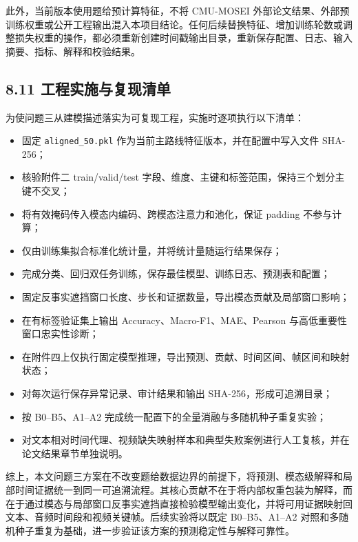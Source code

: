 \documentclass[
  12pt,
  a4paper,
]{ctexart}
\providecommand{\tightlist}{%
  \setlength{\itemsep}{0pt}\setlength{\parskip}{0pt}}
\begin{document}
此外，当前版本使用题给预计算特征，不将 CMU-MOSEI
外部论文结果、外部预训练权重或公开工程输出混入本项目结论。任何后续替换特征、增加训练轮数或调整损失权重的操作，都必须重新创建时间戳输出目录，重新保存配置、日志、输入摘要、指标、解释和校验结果。

\hypertarget{ux5de5ux7a0bux5b9eux65bdux4e0eux590dux73b0ux6e05ux5355}{%
\subsection{8.11
工程实施与复现清单}\label{ux5de5ux7a0bux5b9eux65bdux4e0eux590dux73b0ux6e05ux5355}}

为使问题三从建模描述落实为可复现工程，实施时逐项执行以下清单：

\begin{itemize}
\tightlist
\item[$\boxtimes$]
  固定 \texttt{aligned\_50.pkl}
  作为当前主路线特征版本，并在配置中写入文件 SHA-256；
\item[$\boxtimes$]
  核验附件二 train/valid/test
  字段、维度、主键和标签范围，保持三个划分主键不交叉；
\item[$\boxtimes$]
  将有效掩码传入模态内编码、跨模态注意力和池化，保证 padding
  不参与计算；
\item[$\boxtimes$]
  仅由训练集拟合标准化统计量，并将统计量随运行结果保存；
\item[$\boxtimes$]
  完成分类、回归双任务训练，保存最佳模型、训练日志、预测表和配置；
\item[$\boxtimes$]
  固定反事实遮挡窗口长度、步长和证据数量，导出模态贡献及局部窗口影响；
\item[$\boxtimes$]
  在有标签验证集上输出 Accuracy、Macro-F1、MAE、Pearson
  与高低重要性窗口忠实性诊断；
\item[$\boxtimes$]
  在附件四上仅执行固定模型推理，导出预测、贡献、时间区间、帧区间和映射状态；
\item[$\boxtimes$]
  对每次运行保存异常记录、审计结果和输出 SHA-256，形成可追溯目录；
\item[$\square$]
  按 B0--B5、A1--A2 完成统一配置下的全量消融与多随机种子重复实验；
\item[$\square$]
  对文本相对时间代理、视频缺失映射样本和典型失败案例进行人工复核，并在论文结果章节单独说明。
\end{itemize}

综上，本文问题三方案在不改变题给数据边界的前提下，将预测、模态级解释和局部时间证据统一到同一可追溯流程。其核心贡献不在于将内部权重包装为解释，而在于通过模态与局部窗口反事实遮挡直接检验模型输出变化，并将可用证据映射回文本、音频时间段和视频关键帧。后续实验将以既定
B0--B5、A1--A2
对照和多随机种子重复为基础，进一步验证该方案的预测稳定性与解释可靠性。
\end{document}
